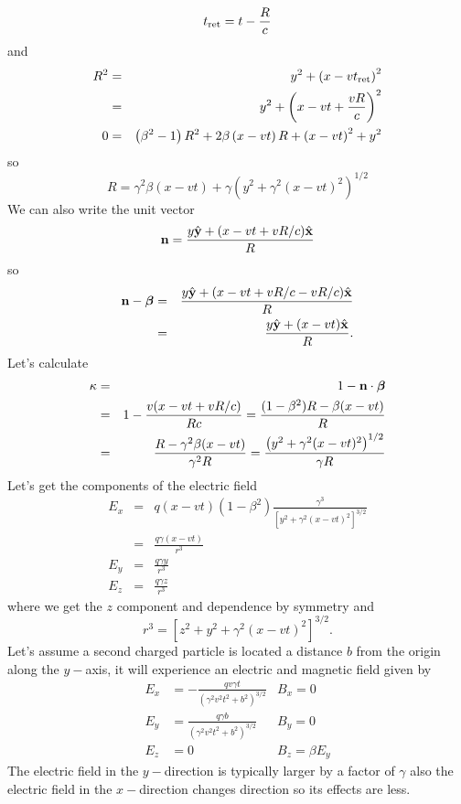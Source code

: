 \begin{equation}
t_{\hbox{\rm \scriptsize ret}} = t - \frac{R}{c}
\label{eq:349}
\end{equation}
and
\begin{eqnarray}
R^2 &=& y^2 + \left ( x - v t_{\hbox{\rm \scriptsize ret}} \right )^2 \\
    &=& y^2 + \left ( x - v t + \frac{v R}{c} \right )^2 \\
0 &=& \left ( \beta^2 - 1 \right ) R^2 + 2 \beta \left (  x - v t
        \right ) R + \left ( x - v t \right )^2 + y^2 
\label{eq:350}
\end{eqnarray}
so
\begin{equation}
R = \gamma^2 \beta (x - v t) + \gamma \left (y^2 + \gamma^2 (x-vt)^2 \right )^{1/2}
\label{eq:351}
\end{equation}
We can also write the unit vector 
\begin{equation}
{\bf n} = \frac{y {\hat {\bf y}} + (x - vt + vR/c){\hat {\bf x}}}{R}
\label{eq:352}
\end{equation}
so
\begin{eqnarray}
{\bf n} - \mbox{\boldmath $\beta$} &=& \frac{y {\hat {\bf y}}+ (x - vt + vR/c -
  vR/c){\hat {\bf x}}}{R} \\
&=& \frac{y {\hat {\bf y}}+ (x - vt){\hat {\bf x}}}{R}.
\label{eq:353}
\end{eqnarray}
Let's calculate 
\begin{eqnarray}
\kappa &=& 1 - {\bf n} \cdot \mbox{\boldmath $\beta$} \\
       &=& 1 - \frac{v (x - vt + vR/c)}{R c} = \frac{(1-\beta^2) R -
       \beta (x - v t)}{R} \\
       &=&  \frac{ R -  \gamma^2 \beta (x - v t)}{\gamma^2 R} = \frac{\left
       ( y^2 + \gamma^2 (x-vt)^2 \right)^{1/2}}{\gamma R}
\label{eq:354}
\end{eqnarray}
Let's get the components of the electric field
\begin{eqnarray}
E_x &=& q(x - v
t)(1-\beta^2)\frac{\gamma^3}{\left[y^2+\gamma^2(x-vt)^2\right]^{3/2}}
\\
    &=& \frac{q\gamma (x-vt)}{r^3} \\
E_y &=& \frac{q\gamma y}{r^3} \\
E_z &=& \frac{q\gamma z}{r^3} 
\label{eq:355}
\end{eqnarray}
where we get the $z$ component and dependence by symmetry and 
\begin{equation}
r^3 = \left[z^2+y^2+\gamma^2(x-vt)^2\right]^{3/2}.
\label{eq:356}
\end{equation}
Let's assume a second charged particle is located a distance $b$ from
the origin along the $y-$axis, it will experience an electric and
magnetic field given by
\begin{eqnarray}
E_x &= -\frac{qv \gamma t}{(\gamma^2 v^2 t^2 + b^2)^{3/2}} &B_x =0 \\
E_y &= \frac{q \gamma b}{(\gamma^2 v^2 t^2 + b^2)^{3/2}}  &B_y =0 \\
E_z &= 0   &B_z =\beta E_y
\label{eq:357}
\end{eqnarray}
The electric field in the $y-$direction is typically larger by a
factor of $\gamma$ also the electric field in the $x-$direction
changes direction so its effects are less.

